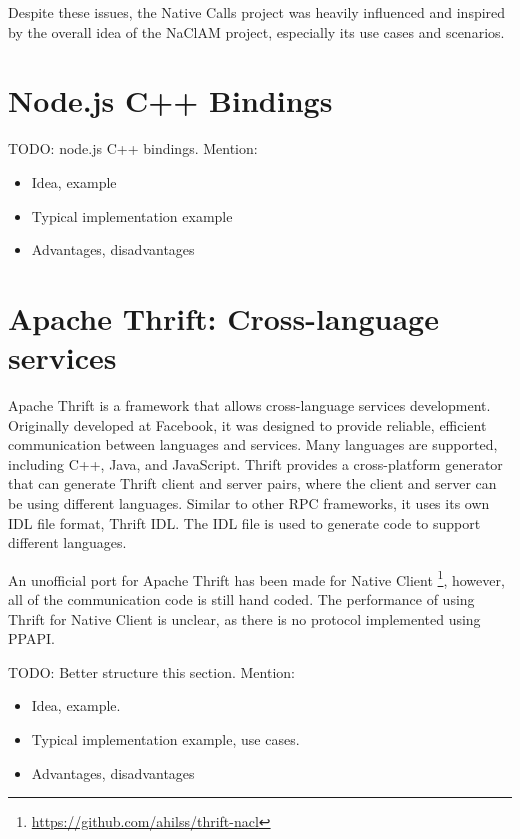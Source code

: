 Despite these issues, the Native Calls project was heavily influenced and inspired by the overall idea of the NaClAM project, especially its use cases and scenarios.


\section{Node.js C++ Bindings} %
\label{sec:node_js_c_bindings}
TODO: node.js C++ bindings. Mention:
\begin{itemize}
	\item Idea, example
	\item Typical implementation example
	\item Advantages, disadvantages
\end{itemize}



\section{Apache Thrift: Cross-language services} %
\label{sec:apache_thrift_cross_language_services}
Apache Thrift is a framework that allows cross-language services development. Originally developed at Facebook, it was designed to provide reliable, efficient communication between languages and services. Many languages are supported, including C++, Java, and JavaScript. Thrift provides a cross-platform generator that can generate Thrift client and server pairs, where the client and server can be using different languages. Similar to other RPC frameworks, it uses its own IDL file format, Thrift IDL. The IDL file is used to generate code to support different languages.

An unofficial port for Apache Thrift has been made for Native Client \footnote{\url{https://github.com/ahilss/thrift-nacl}}, however, all of the communication code is still hand coded. The performance of using Thrift for Native Client is unclear, as there is no protocol implemented using PPAPI.

TODO: Better structure this section. Mention:
\begin{itemize}
	\item Idea, example.
	\item Typical implementation example, use cases.
	\item Advantages, disadvantages
\end{itemize}


